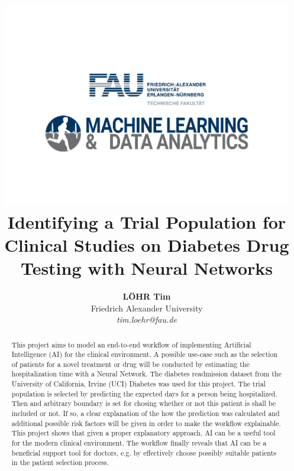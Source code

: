 \documentclass[journal]{IEEEtran}
\begin{document}
    \title{
    	\includegraphics[width=5in]{../imgs/logo_paper3.pdf} 
    	\newline
     Identifying a Trial Population for Clinical Studies on Diabetes Drug Testing with Neural Networks \\ 
     }

  \author{\textbf{L\"OHR Tim} \\ Friedrich Alexander University \\ \textit{tim.loehr@fau.de}}




\maketitle
\begin{abstract}
This project aims to model an end-to-end workflow of implementing Artificial Intelligence (AI) for the clinical environment. A possible use-case such as the selection of patients for a novel treatment or drug will be conducted by estimating the hospitalization time with a Neural Network.
The diabetes readmission dataset from the University of California, Irvine (UCI) Diabetes was used for this project. The trial population is selected by predicting the expected days for a person being hospitalized. Then and arbitrary boundary is set for chosing whether or not this patient is shall be included or not. If so, a clear explanation of the how the prediction was calculated and additional possible risk factors will be given in order to make the workflow explainable. This project shows that given a proper explanatory approach, AI can be a useful tool for the modern clinical environment. The workflow finally reveals that AI can be a beneficial support tool for doctors, e.g. by effectively choose possibly suitable patients in the patient selection process. 
\end{abstract}
\end{document}
